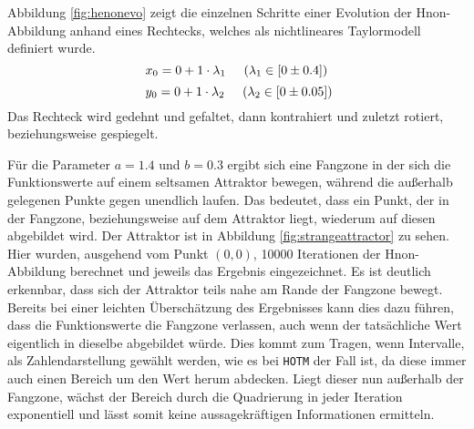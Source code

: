 Abbildung \ref{fig:henonevo} zeigt die einzelnen Schritte einer Evolution der H\e non-Abbildung anhand eines Rechtecks, welches als nichtlineares Taylormodell definiert wurde.
$$x_0 = 0 + 1 \cdot \lambda_1 \hspace{.5cm} (\lambda_1 \in [0 \pm 0.4])$$
$$\ y_0 = 0 + 1 \cdot \lambda_2 \hspace{.5cm} (\lambda_2 \in [0 \pm 0.05])$$
Das Rechteck wird gedehnt und gefaltet, dann kontrahiert und zuletzt rotiert, beziehungsweise gespiegelt. 


Für die Parameter $a=1.4$ und $b=0.3$ ergibt sich eine Fangzone in der sich die Funktionswerte auf einem seltsamen Attraktor bewegen, während die außerhalb gelegenen Punkte gegen unendlich laufen. Das bedeutet, dass ein Punkt, der in der Fangzone, beziehungsweise auf dem Attraktor liegt, wiederum auf diesen abgebildet wird. Der Attraktor ist in Abbildung \ref{fig:strangeattractor} zu sehen. Hier wurden, ausgehend vom Punkt $(0,0)$, 10000 Iterationen der H\e non-Abbildung berechnet und jeweils das Ergebnis eingezeichnet. Es ist deutlich erkennbar, dass sich der Attraktor teils nahe am Rande der Fangzone bewegt. Bereits bei einer leichten Überschätzung des Ergebnisses kann dies dazu führen, dass die Funktionswerte die Fangzone verlassen, auch wenn der tatsächliche Wert eigentlich in dieselbe abgebildet würde. Dies kommt zum Tragen, wenn Intervalle, als Zahlendarstellung gewählt werden, wie es bei \verb+HOTM+ der Fall ist, da diese immer auch einen Bereich um den Wert herum abdecken. Liegt dieser nun außerhalb der Fangzone, wächst der Bereich durch die Quadrierung in jeder Iteration exponentiell und lässt somit keine aussagekräftigen Informationen ermitteln.






